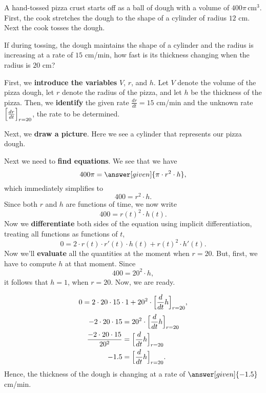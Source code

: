 \documentclass{ximera}
\begin{document}
\begin{example}
A hand-tossed pizza crust starts off as a ball of dough with a volume
of $400\pi\, \text{cm}^3$. First, the cook stretches the dough to the
shape of a cylinder of radius $12$ cm. Next the cook tosses the
dough.

If during tossing, the dough maintains the shape of a cylinder and the
radius is increasing at a rate of $15$ cm/min, how fast is its
thickness changing when the radius is $20$ cm?
\begin{explanation}
 First, we \textbf{introduce the variables} $V$, $r$, and $h$. Let $V$ denote the volume of the pizza dough, let $r$ denote the radius of the pizza, and  let $h$ be the thickness of the pizza. Then, we \textbf{identify} the given rate $\frac{dr}{dt}=15$ cm/min and the unknown rate $\Bigl[\frac{dr}{dt}\Bigr]_{r=20}$, the rate to be determined.   

  Next, we \textbf{draw a picture}. Here we see a cylinder that
  represents our pizza dough.
  \begin{image}
  \end{image}
  Next we need to \textbf{find equations}. We see that we have
  \[
  400\pi = \answer[given]{\pi \cdot r^2 \cdot h},
  \]
  which immediately simplifies to
  \[
  400 = r^2 \cdot h.
  \]
  Since both $r$ and $h$ are functions of time, we now write
  \[
  400 = r(t)^2 \cdot h(t).
  \]
  Now we \textbf{differentiate} both sides of  the equation using implicit
  differentiation, treating all functions as functions of $t$,
  \[
  0 = 2\cdot r(t) \cdot r'(t) \cdot h(t) + r(t)^2 \cdot h'(t).
  \]
  Now we'll \textbf{evaluate} all  the quantities at the moment when $r=20$. 
  But, first, we have to compute $h$ at that moment. Since
  \[
 400 = 20^2 \cdot h, 
  \] it follows that $h=1$, when $r=20$. Now, we are ready.
  
 \[
 0 = 2\cdot 20 \cdot 15 \cdot 1 + 20^2 \cdot \Bigl[\frac{d}{dt}h\Bigr]_{r=20},
  \]
  \begin{align*}
    -2\cdot 20 \cdot 15  &= 20^2 \cdot  \Bigl[\frac{d}{dt}h\Bigr]_{r=20}\\
    \frac{-2\cdot 20 \cdot 15}{20^2}  &=  \Bigl[\frac{d}{dt}h\Bigr]_{r=20}\\
    -1.5  &=  \Bigl[\frac{d}{dt}h\Bigr]_{r=20}.
  \end{align*}
  Hence, the thickness of the dough is changing at a rate of $\answer[given]{-1.5}$
  cm/min.
\end{explanation}
\end{example}
\end{document}
